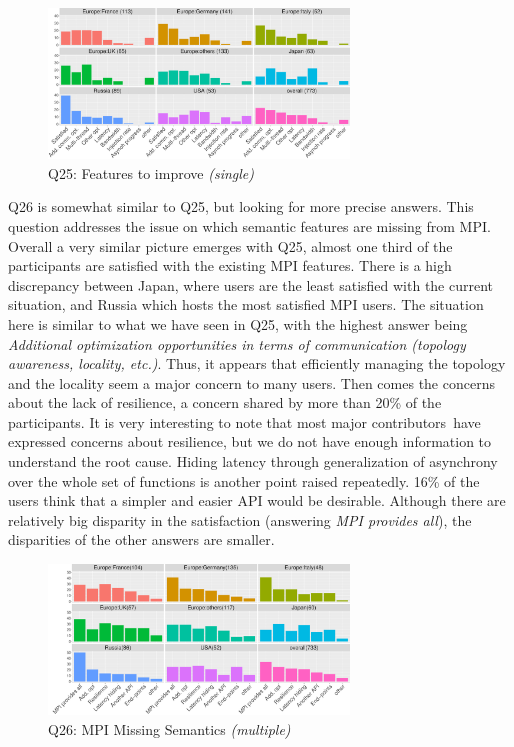 \documentclass[preprint,5p,times]{elsarticle}
\def\myquote#1{{\it #1}}
\newcommand{\revision}[2]{{\color{blue}#2}}
\def\mcountries{major contributors\xspace{}}%
\begin{document}
\begin{figure}[tb]
\begin{center}
\includegraphics[width=8.0cm]{R-scripts/Q25.pdf}
\caption{Q25: Features to improve {\it(single)}}
\label{fig:missing-features}
\vspace{-3mm}%
\end{center}
\end{figure}

Q26 is somewhat similar to Q25, but looking for more precise answers. This
question \revision{tackles}{addresses} the issue on which semantic features are missing from MPI.
Overall a very similar picture emerges with Q25, almost one third of the
participants are satisfied with the existing MPI features. There is a high
discrepancy between Japan, where users are the least satisfied with the current
situation, and Russia which hosts the most satisfied MPI users.
%
The situation here is similar to what we \revision{}{have} seen in Q25, with the highest answer
being \myquote{Additional optimization opportunities in terms of communication
(topology awareness, locality, etc.)}. Thus, it appears that efficiently
managing the topology and the locality seem a major concern to many users. Then
comes the concerns about the lack of resilience, a concern shared by more than
20\% of the participants. It is very interesting to note that most \mcountries\
have expressed concerns about resilience, but we do not have enough information
to understand the root cause. Hiding latency through generalization of
asynchrony over the whole set of functions is another point raised repeatedly.
16\% of the users think that a simpler and easier API would be desirable.
Although there are relatively big disparity in the satisfaction (answering
\myquote{MPI provides all}), the disparities of the other answers are smaller.

\begin{figure}[tb]
\begin{center}
\includegraphics[width=8.0cm]{R-scripts/Q26.pdf}
\caption{Q26: MPI Missing Semantics {\it(multiple)}}
\label{fig:missing-semantics}
\vspace{-3mm}%
\end{center}
\end{figure}
\end{document}

